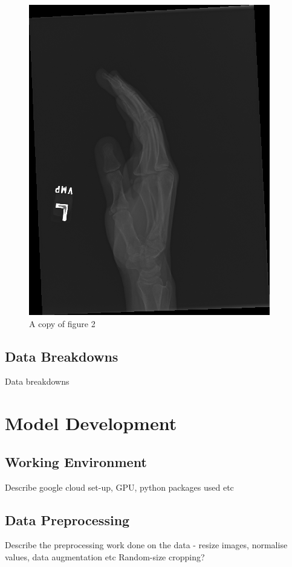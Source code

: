 \documentclass[11pt]{article} %
\theoremstyle{plain}
\theoremstyle{definition}
\begin{document}
\begin{figure}
  \caption{A copy of figure 2}
  \label{fig:xray2_copy}
  \includegraphics[scale=0.5]{image2_copy.png}
\end{figure}
\clearpage
\noindent

\subsection{Data Breakdowns}
Data breakdowns



\newpage
\section{Model Development}

\subsection{Working Environment}
Describe google cloud set-up, GPU, python packages used etc

\subsection{Data Preprocessing}
Describe the preprocessing work done on the data - resize images, normalise values, data augmentation etc 
Random-size cropping?
\end{document}
